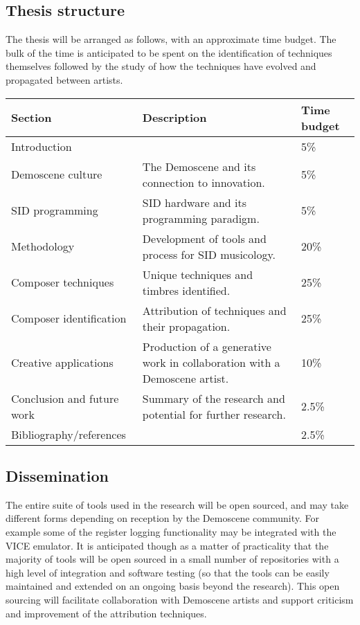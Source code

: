 \documentclass[10pt]{article}
\begin{document}
\begin{multicols*}{2}
  \section{Thesis structure}
  The thesis will be arranged as follows, with an approximate time budget. The bulk of the time
  is anticipated to be spent on the identification of techniques themselves followed by the
  study of how the techniques have evolved and propagated between artists.

  \begin{tabular}{|l|l|l|}
        \hline
        Section & Description & Time budget \\
        \hline
        Introduction &  & 5\% \\
        \hline
        Demoscene culture & The Demoscene and its connection to innovation. & 5\% \\
        \hline
        SID programming & SID hardware and its programming paradigm. & 5\% \\
        \hline
        Methodology & Development of tools and process for SID musicology. & 20\% \\
        \hline
        Composer techniques & Unique techniques and timbres identified. & 25\% \\
        \hline
        Composer identification & Attribution of techniques and their propagation. & 25\% \\
        \hline
        Creative applications & Production of a generative work in collaboration with a Demoscene artist.  & 10\% \\
        \hline
        Conclusion and future work & Summary of the research and potential for further research. & 2.5\% \\
        \hline
        Bibliography/references &  & 2.5\% \\
        \hline
  \end{tabular}

  \subsection{Dissemination}
  The entire suite of tools used in the research will be open sourced,
  and may take different forms depending on reception by the Demoscene
  community. For example some of the register logging functionality
  may be integrated with the VICE emulator. It is anticipated though
  as a matter of practicality that the majority of tools will be open
  sourced in a small number of repositories with a high level of
  integration and software testing (so that the tools can be easily
  maintained and extended on an ongoing basis beyond the research).
  This open sourcing will facilitate collaboration with Demoscene
  artists and support criticism and improvement of the attribution
  techniques.


\end{multicols*}
\end{document}
